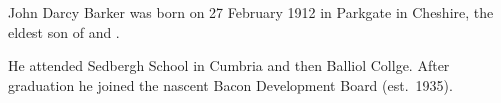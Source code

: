 
John Darcy Barker was born on 27 February 1912 in Parkgate in Cheshire,
the eldest son of  and .\cite{BalliolRegister1931, JDBarkerBirth}

He attended Sedbergh School in Cumbria and then Balliol Collge.
After graduation he joined the nascent Bacon Development Board (est.~1935).\cite{BalliolRegister1931}
